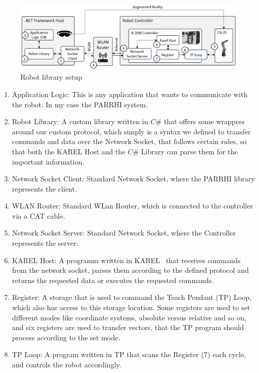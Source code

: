 \begin{figure}
	\centering
	\includegraphics[width=1\textwidth]{Figures/RobotArchitecture.jpg}
	\caption{Robot library setup}
	\label{Fig:RobotArchitecture}
\end{figure}

\begin{enumerate}
	\item Application Logic: This is any application that wants to communicate with the robot. In my case the PARRHI system.
	\item Robot Library: A custom library written in $C\#$ that offers some wrappers around our custom protocol, which simply is a syntax we defined to transfer commands and data over the Network Socket, that follows certain rules, so that both the KAREL Host and the $C\#$ Library can parse them for the important information.
	\item Network Socket Client: Standard Network Socket, where the PARRHI library represents the client.
	\item WLAN Router: Standard WLan Router, which is connected to the controller via a CAT cable.
	\item Network Socket Server: Standard Network Socket, where the Controller represents the server.
	\item KAREL Host: A programm written in KAREL~\cite{FanucKarel} that receives commands from the network socket, parses them according to the defined protocol and returns the requested data or executes the requested commands.
	\item Register: A storage that is used to command the Teach Pendant (TP) Loop, which also has access to this storage location. Some registers are used to set different modes like coordinate systems, absolute versus relative and so on, and six registers are used to transfer vectors, that the TP program should process according to the set mode.
	\item TP Loop: A program written in TP that scans the Register (7) each cycle, and controls the robot accordingly.
\end{enumerate}

